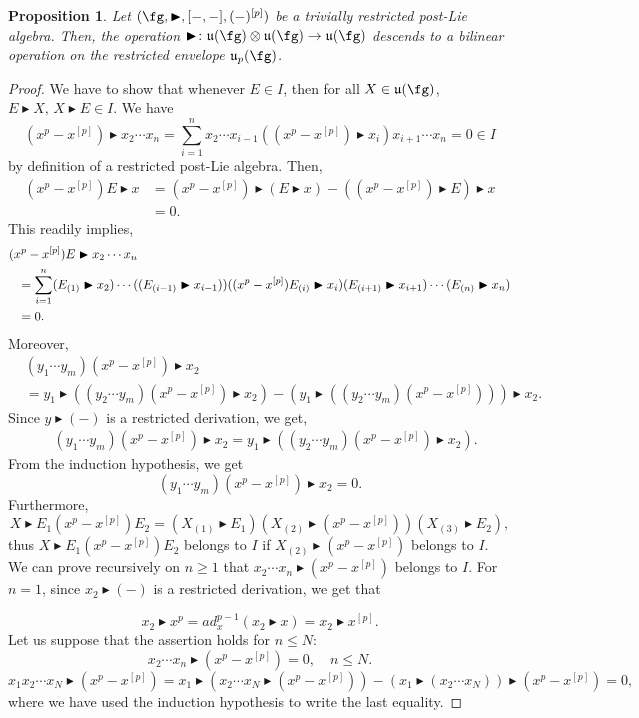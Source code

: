 \documentclass[12pt]{article}
\newcommand{\btr}{\blacktriangleright}
\newtheorem{proposition}[theorem]{Proposition}
\begin{document}
\begin{proposition} Let $(\fg, \btr, [-,-], (-)^{[p]})$ be a trivially restricted post-Lie algebra. Then, the operation $\btr\colon \mathfrak{u}(\fg)\otimes \mathfrak{u}(\fg) \to \mathfrak{u}(\fg)$ descends to a bilinear operation on the restricted envelope $\mathfrak{u}_p(\fg)$.
\end{proposition}
\begin{proof} 
We have to show that whenever $E\in I$, then for all $X\in \mathfrak{u}(\fg)$, $E \btr X,\, X\btr E \in I$. We have
$$
(x^{p} - x^{[p]}) \btr x_2\cdots x_n = \sum_{i=1}^{n}  x_2\cdots x_{i-1}((x^{p} - x^{[p]}) \btr x_i) x_{i+1}\cdots x_n = 0 \in I
$$
by definition of a restricted post-Lie algebra. Then,
\begin{align}
(x^{p} - x^{[p]})E\btr x&= (x^{p} - x^{[p]}) \btr (E\btr x) - ((x^{p} - x^{[p]}) \btr E) \btr x \\
&=0.
\end{align}
This readily implies, 
\begin{align*}
&(x^{p} - x^{[p]})E\btr x_2\cdots x_n \\
&\hspace{0.25cm}= \sum_{i=1}^n (E_{(1)}\btr x_2)\cdots ((E_{(i-1)}\btr x_{i-1}))((x^{p} - x^{[p]})E_{(i)} \btr x_i) (E_{(i+1)}\btr x_{i+1})\cdots (E_{(n)} \btr x_n) \\
&\hspace{0.25cm}=0.
\end{align*}
Moreover,
\begin{align}
&(y_1\cdots y_m)(x^{p} - x^{[p]})\btr x_2 \\ 
&= y_1 \btr ((y_2\cdots y_m)(x^{p} - x^{[p]})\btr x_2) - (y_1 \btr ((y_2\cdots y_m)(x^{p} - x^{[p]})))\btr x_2.
\end{align}
Since $y\btr (-)$ is a restricted derivation, we get, 
\begin{align}
&(y_1\cdots y_m)(x^{p} - x^{[p]})\btr x_2 = y_1 \btr ((y_2\cdots y_m)(x^{p} - x^{[p]})\btr x_2). 
\end{align}
From the induction hypothesis, we get 
$$
(y_1\cdots y_m)(x^{p} - x^{[p]})\btr x_2 = 0.
$$
Furthermore, 
$$
X\btr E_1(x^{p} - x^{[p]})E_2 = (X_{(1)}\btr E_1)(X_{(2)}\btr (x^{p} - x^{[p]}) )(X_{(3)}\btr E_2),
$$
thus $X\btr E_1(x^{p} - x^{[p]})E_2$ belongs to $I$ if $X_{(2)}\btr (x^{p} - x^{[p]})$ belongs to $I$. We can prove recursively on $n\geq 1$ that $x_2 \cdots x_n \btr(x^{p} - x^{[p]}) $ belongs to $I$. For $n=1$, since $x_2 \btr (-)$ is a restricted derivation, we get that

$$ 
x_2 \btr x^{p} = ad^{p-1}_x(x_2\btr x) = x_2 \btr x^{[p]}.
$$
Let us suppose that the assertion holds for $n \leq N$: 
$$
x_2\cdots x_n \btr (x^p-x^{[p]}) = 0, \quad  n\leq N.
$$
$$
x_1x_2\cdots x_{N} \btr (x^{p} - x^{[p]})= x_1 \btr (x_2\cdots x_{N} \btr (x^{p}-x^{[p]})) - (x_1 \btr( x_2\cdots x_{N})) \btr (x^p-x^{[p]})
= 0,
$$
where we have used the induction hypothesis to write the last equality.
\end{proof}
\end{document}
